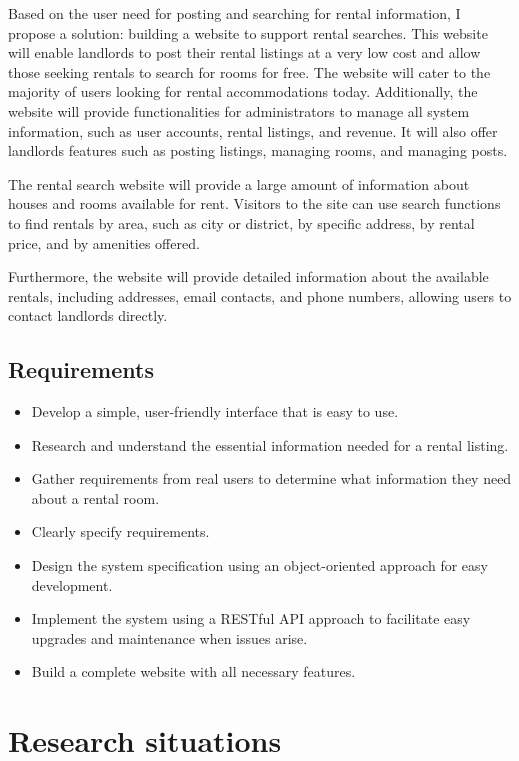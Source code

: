 \documentclass[../Main.tex]{subfiles}
\begin{document}
Based on the user need for posting and searching for rental information, I propose a solution: building a website to support rental searches.
This website will enable landlords to post their rental listings at a very low cost and allow those seeking rentals to search for rooms for free.
The website will cater to the majority of users looking for rental accommodations today.
Additionally, the website will provide functionalities for administrators to manage all system information, such as user accounts, rental listings, and revenue.
It will also offer landlords features such as posting listings, managing rooms, and managing posts.

The rental search website will provide a large amount of information about houses and rooms available for rent.
Visitors to the site can use search functions to find rentals by area, such as city or district, by specific address, by rental price, and by amenities offered.

Furthermore, the website will provide detailed information about the available rentals, including addresses, email contacts, and phone numbers, allowing users to contact landlords directly.

\subsection{Requirements}

\begin{itemize}
    \item Develop a simple, user-friendly interface that is easy to use.
    \item Research and understand the essential information needed for a rental listing.
    \item Gather requirements from real users to determine what information they need about a rental room.
    \item Clearly specify requirements.
    \item Design the system specification using an object-oriented approach for easy development.
    \item Implement the system using a RESTful API approach to facilitate easy upgrades and maintenance when issues arise.
    \item Build a complete website with all necessary features.
\end{itemize}

\section{Research situations}
\label{section:research}
\end{document}
